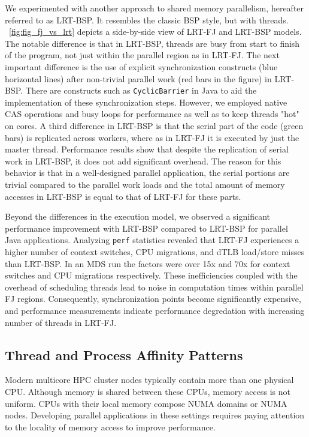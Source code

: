 \documentclass[10pt, conference, compsocconf]{IEEEtran}
\begin{document}
We experimented with another approach to shared memory parallelism, hereafter referred to as \ac{LRT-BSP}. It resembles the classic \ac{BSP} style, but with threads. \figurename~\ref{fig:fig_fj_vs_lrt} depicts a side-by-side view of \ac{LRT-FJ} and \ac{LRT-BSP} models. The notable difference is that in \ac{LRT-BSP}, threads are busy from start to finish of the program, not just within the parallel region as in \ac{LRT-FJ}. The next important difference is the use of explicit synchronization constructs (blue horizontal lines) after non-trivial parallel work (red bars in the figure) in \ac{LRT-BSP}. There are constructs such as \texttt{CyclicBarrier} in Java to aid the implementation of these synchronization steps. However, we employed native \ac{CAS} operations and busy loops for performance as well as to keep threads "hot" on cores.  A third difference in \ac{LRT-BSP} is that the serial part of the code (green bars) is replicated across workers, where as in \ac{LRT-FJ} it is executed by just the master thread. Performance results show that despite the replication of serial work in \ac{LRT-BSP}, it does not add significant overhead. The reason for this behavior is that in a well-designed parallel application, the serial portions are trivial compared to the parallel work loads and the total amount of memory accesses in \ac{LRT-BSP} is equal to that of \ac{LRT-FJ} for these parts. 

Beyond the differences in the execution model, we observed a significant performance improvement with \ac{LRT-BSP} compared to \ac{LRT-BSP} for parallel Java applications. Analyzing \texttt{perf} statistics revealed that \ac{LRT-FJ} experiences a higher number of context switches, \acs{CPU} migrations, and \ac{dTLB} load/store misses than \ac{LRT-BSP}. In an \ac{MDS} run the factors were over 15x and 70x for context switches and \acs{CPU} migrations respectively. These inefficiencies coupled with the overhead of scheduling threads lead to noise in computation times within parallel \ac{FJ} regions. Consequently, synchronization points become significantly expensive, and performance measurements indicate performance degredation with increasing number of threads in \ac{LRT-FJ}.


\subsection{Thread and Process Affinity Patterns}
Modern multicore \ac{HPC} cluster nodes typically contain more than one physical \acs{CPU}. Although memory is shared between these \acp{CPU}, memory access is not uniform. \acp{CPU} with their local memory compose \ac{NUMA} domains or \ac{NUMA} nodes. Developing parallel applications in these settings requires paying attention to the locality of memory access to improve performance.
\end{document}
